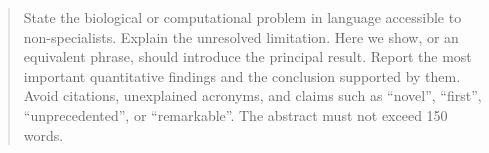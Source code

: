 \begin{abstract}
State the biological or computational problem in language accessible to non-specialists. Explain the unresolved limitation. Here we show, or an equivalent phrase, should introduce the principal result. Report the most important quantitative findings and the conclusion supported by them. Avoid citations, unexplained acronyms, and claims such as ``novel'', ``first'', ``unprecedented'', or ``remarkable''. The abstract must not exceed 150 words.
\end{abstract}
